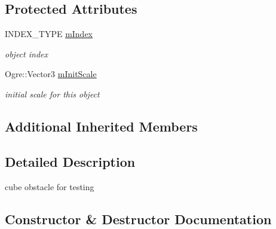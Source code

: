 \subsection*{Protected Attributes}
\begin{DoxyCompactItemize}
\item 
I\+N\+D\+E\+X\+\_\+\+T\+Y\+PE \hyperlink{class_n_c_t_u_1_1_cube_obstacle_a0aa0b74760857bd929749844278f6cfc}{m\+Index}\hypertarget{class_n_c_t_u_1_1_cube_obstacle_a0aa0b74760857bd929749844278f6cfc}{}\label{class_n_c_t_u_1_1_cube_obstacle_a0aa0b74760857bd929749844278f6cfc}

\begin{DoxyCompactList}\small\item\em object index \end{DoxyCompactList}\item 
Ogre\+::\+Vector3 \hyperlink{class_n_c_t_u_1_1_cube_obstacle_a372291c45b79d711ab9c45214cd013b8}{m\+Init\+Scale}\hypertarget{class_n_c_t_u_1_1_cube_obstacle_a372291c45b79d711ab9c45214cd013b8}{}\label{class_n_c_t_u_1_1_cube_obstacle_a372291c45b79d711ab9c45214cd013b8}

\begin{DoxyCompactList}\small\item\em initial scale for this object \end{DoxyCompactList}\end{DoxyCompactItemize}
\subsection*{Additional Inherited Members}


\subsection{Detailed Description}
cube obstacle for testing 

\subsection{Constructor \& Destructor Documentation}
